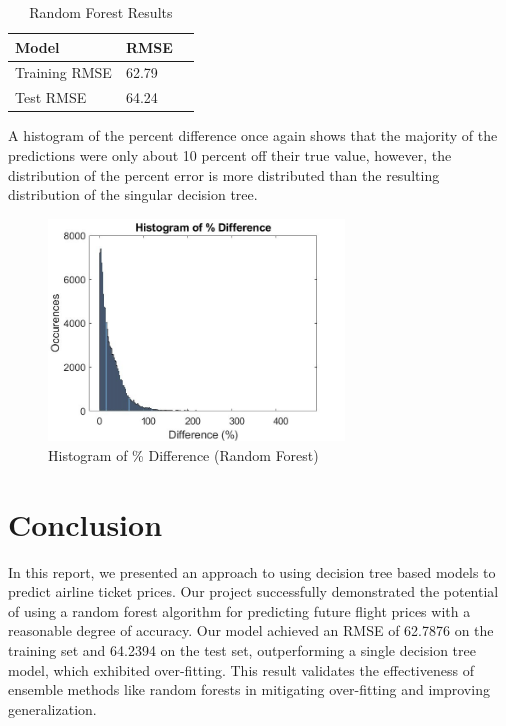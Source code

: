 \documentclass{article}
\begin{document}
\begin{table}[ht]
  \caption{Random Forest Results}
  \label{sample-table}
  \centering
  \begin{tabular}{lll}
    \toprule
    Model     & RMSE \\
    \midrule
    Training RMSE       & 62.79       \\
    Test RMSE           & 64.24      \\
    \bottomrule
  \end{tabular}
\end{table}

A histogram of the percent difference once again shows that the majority of the predictions were only about 10 percent off their true value, however, the distribution of the percent error is more distributed than the resulting distribution of the singular decision tree.

\begin{figure}[h]
\caption{Histogram of \% Difference (Random Forest)}
\centering
\includegraphics[width=0.7\textwidth]{Fig6}
\end{figure}


\section{Conclusion}

In this report, we presented an approach to using decision tree based models to predict airline ticket prices. Our project successfully demonstrated the potential of using a random forest algorithm for predicting future flight prices with a reasonable degree of accuracy. Our model achieved an RMSE of 62.7876 on the training set and 64.2394 on the test set, outperforming a single decision tree model, which exhibited over-fitting. This result validates the effectiveness of ensemble methods like random forests in mitigating over-fitting and improving generalization.
\end{document}
